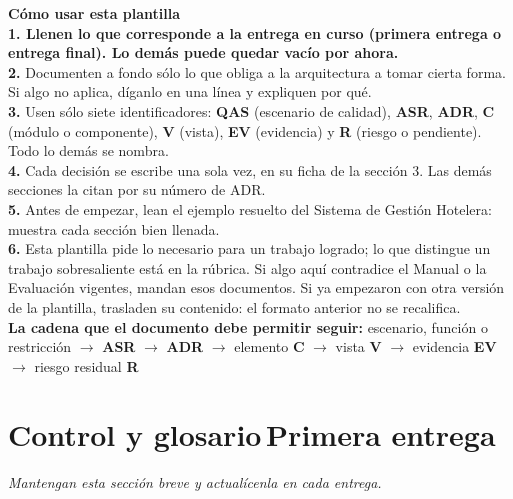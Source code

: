 \documentclass[11pt,letterpaper]{article}
\newcommand{\hint}[1]{{\itshape\color{black!70}#1}\par} %
\newcommand{\bluebadge}[1]{\hspace{0.8em}\colorbox{SADBlueBg}{\scriptsize\bfseries\color{SADBlue}\,#1\,}}
\begin{document}
\vspace{1.4em}
\begin{callout}
  {\bfseries\color{SADBlue}Cómo usar esta plantilla}\\[3pt]
  {\small
  \textbf{1. Llenen lo que corresponde a la entrega en curso (primera entrega o entrega final). Lo demás puede quedar vacío por ahora.}\\[3pt]
  \textbf{2.} Documenten a fondo sólo lo que obliga a la arquitectura a tomar cierta forma. Si algo no aplica, díganlo en una línea y expliquen por qué.\\[3pt]
  \textbf{3.} Usen sólo siete identificadores: \textbf{QAS} (escenario de calidad), \textbf{ASR}, \textbf{ADR}, \textbf{C} (módulo o componente), \textbf{V} (vista), \textbf{EV} (evidencia) y \textbf{R} (riesgo o pendiente). Todo lo demás se nombra.\\[3pt]
  \textbf{4.} Cada decisión se escribe una sola vez, en su ficha de la sección 3. Las demás secciones la citan por su número de ADR.\\[3pt]
  \textbf{5.} Antes de empezar, lean el ejemplo resuelto del Sistema de Gestión Hotelera: muestra cada sección bien llenada.\\[3pt]
  \textbf{6.} Esta plantilla pide lo necesario para un trabajo logrado; lo que distingue un trabajo sobresaliente está en la rúbrica. Si algo aquí contradice el Manual o la Evaluación vigentes, mandan esos documentos. Si ya empezaron con otra versión de la plantilla, trasladen su contenido: el formato anterior no se recalifica.\\[5pt]
  {\bfseries\color{SADBlue}La cadena que el documento debe permitir seguir:} escenario, función o restricción $\rightarrow$ \textbf{ASR} $\rightarrow$ \textbf{ADR} $\rightarrow$ elemento \textbf{C} $\rightarrow$ vista \textbf{V} $\rightarrow$ evidencia \textbf{EV} $\rightarrow$ riesgo residual \textbf{R}}
\end{callout}

\newpage

\section{Control y glosario\bluebadge{Primera entrega}}
\hint{Mantengan esta sección breve y actualícenla en cada entrega.}
\end{document}
